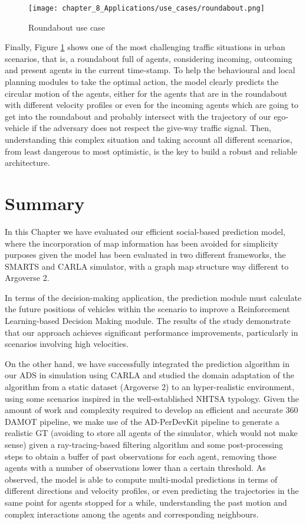 \begin{figure}[!h]
	\centering
	\texttt{[image: chapter\_8\_Applications/use\_cases/roundabout.png]}
	\caption{Roundabout use case}
	\label{fig:chapter_8_Applications/use_cases/roundabout}
\end{figure}

Finally, Figure \ref{fig:chapter_8_Applications/use_cases/roundabout} shows one of the most challenging traffic situations in urban scenarios, that is, a roundabout full of agents, considering incoming, outcoming and present agents in the current time-stamp. To help the behavioural and local planning modules to take the optimal action, the model clearly predicts the circular motion of the agents, either for the agents that are in the roundabout with different velocity profiles or even for the incoming agents which are going to get into the roundabout and probably intersect with the trajectory of our ego-vehicle if the adversary does not respect the give-way traffic signal. Then, understanding this complex situation and taking account all different scenarios, from least dangerous to most optimistic, is the key to build a robust and reliable architecture.

\section{Summary}
\label{sec:8_summary}

In this Chapter we have evaluated our efficient social-based prediction model, where the incorporation of map information has been avoided for simplicity purposes given the model has been evaluated in two different frameworks, the SMARTS and CARLA simulator, with a graph map structure way different to Argoverse 2.

In terms of the decision-making application, the prediction module must calculate the future positions of vehicles within the scenario to improve a Reinforcement Learning-based Decision Making module. The results of the study demonstrate that our approach achieves significant performance improvements, particularly in scenarios involving high velocities.

On the other hand, we have successfully integrated the prediction algorithm in our \ac{ADS} in simulation using CARLA and studied the domain adaptation of the algorithm from a static dataset (Argoverse 2) to an hyper-realistic environment, using some scenarios inspired in the well-established \ac{NHTSA} typology. Given the amount of work and complexity required to develop an efficient and accurate 360 \degree \ac{DAMOT} pipeline, we make use of the \ac{AD-PerDevKit} pipeline to generate a realistic \ac{GT} (avoiding to store all agents of the simulator, which would not make sense) given a ray-tracing-based filtering algorithm and some post-processing steps to obtain a buffer of past observations for each agent, removing those agents with a number of observations lower than a certain threshold. As observed, the model is able to compute multi-modal predictions in terms of different directions and velocity profiles, or even predicting the trajectories in the same point for agents stopped for a while, understanding the past motion and complex interactions among the agents and corresponding neighbours. 

